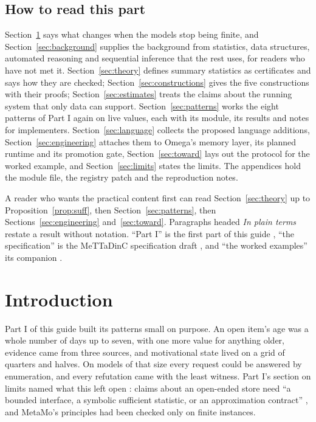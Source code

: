 \documentclass[11pt]{article}
\theoremstyle{definition}
\theoremstyle{plain}
\begin{document}
\subsection*{How to read this part}
Section~\ref{sec:intro} says what changes when the models stop being finite, and
Section~\ref{sec:background} supplies the background from statistics, data structures, automated
reasoning and sequential inference that the rest uses, for readers who have not met it.
Section~\ref{sec:theory} defines summary statistics as certificates and says how they are checked;
Section~\ref{sec:constructions} gives the five constructions with their proofs;
Section~\ref{sec:estimates} treats the claims about the running system that only data can support.
Section~\ref{sec:patterns} works the eight patterns of Part I again on live values, each with its
module, its results and notes for implementers. Section~\ref{sec:language} collects the proposed
language additions, Section~\ref{sec:engineering} attaches them to Omega's memory layer, its
planned runtime and its promotion gate, Section~\ref{sec:toward} lays out the protocol for the
worked example, and
Section~\ref{sec:limits} states the limits. The appendices hold the module file, the registry patch
and the reproduction notes.

A reader who wants the practical content first can read Section~\ref{sec:theory} up to
Proposition~\ref{prop:suff}, then Section~\ref{sec:patterns}, then
Sections~\ref{sec:engineering} and~\ref{sec:toward}. Paragraphs headed \emph{In plain terms}
restate a result without notation. ``Part I'' is the first part of this guide \cite{part1}, ``the
specification'' is the MeTTaDinC specification draft \cite{spec}, and ``the worked examples'' its
companion \cite{worked}.

\clearpage
{\setlength{\parskip}{0pt}\tableofcontents}
\clearpage
\section{Introduction}\label{sec:intro}

Part I of this guide built its patterns small on purpose. An open item's age was a whole number of
days up to seven, with one more value for anything older, evidence came from three sources, and
motivational state lived on a grid of quarters and halves. On models of that size every request
could be answered by enumeration, and every refutation came with the least witness. Part I's section
on limits named what this left open \cite[Section~14]{part1}: claims about an open-ended store need
``a bounded interface, a symbolic sufficient statistic, or an approximation contract''
\cite[Section~12.4]{spec}, and MetaMo's principles had been checked only on finite instances.
\end{document}

